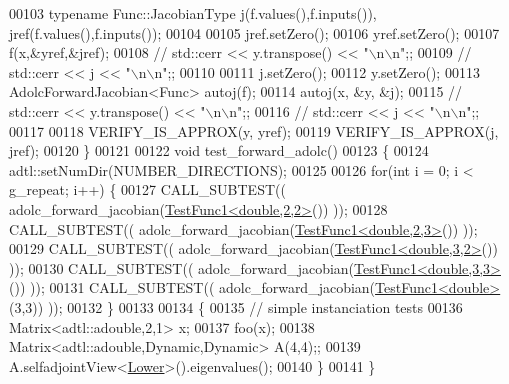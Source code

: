 \begin{DoxyCode}
00103     \textcolor{keyword}{typename} Func::JacobianType j(f.values(),f.inputs()), jref(f.values(),f.inputs());
00104 
00105     jref.setZero();
00106     yref.setZero();
00107     f(x,&yref,&jref);
00108 \textcolor{comment}{//     std::cerr << y.transpose() << "\(\backslash\)n\(\backslash\)n";;}
00109 \textcolor{comment}{//     std::cerr << j << "\(\backslash\)n\(\backslash\)n";;}
00110 
00111     j.setZero();
00112     y.setZero();
00113     AdolcForwardJacobian<Func> autoj(f);
00114     autoj(x, &y, &j);
00115 \textcolor{comment}{//     std::cerr << y.transpose() << "\(\backslash\)n\(\backslash\)n";;}
00116 \textcolor{comment}{//     std::cerr << j << "\(\backslash\)n\(\backslash\)n";;}
00117 
00118     VERIFY\_IS\_APPROX(y, yref);
00119     VERIFY\_IS\_APPROX(j, jref);
00120 \}
00121 
00122 \textcolor{keywordtype}{void} test\_forward\_adolc()
00123 \{
00124   adtl::setNumDir(NUMBER\_DIRECTIONS);
00125 
00126   \textcolor{keywordflow}{for}(\textcolor{keywordtype}{int} i = 0; i < g\_repeat; i++) \{
00127     CALL\_SUBTEST(( adolc\_forward\_jacobian(\hyperlink{struct_test_func1}{TestFunc1<double,2,2>}()) ));
00128     CALL\_SUBTEST(( adolc\_forward\_jacobian(\hyperlink{struct_test_func1}{TestFunc1<double,2,3>}()) ));
00129     CALL\_SUBTEST(( adolc\_forward\_jacobian(\hyperlink{struct_test_func1}{TestFunc1<double,3,2>}()) ));
00130     CALL\_SUBTEST(( adolc\_forward\_jacobian(\hyperlink{struct_test_func1}{TestFunc1<double,3,3>}()) ));
00131     CALL\_SUBTEST(( adolc\_forward\_jacobian(\hyperlink{struct_test_func1}{TestFunc1<double>}(3,3)) ));
00132   \}
00133 
00134   \{
00135     \textcolor{comment}{// simple instanciation tests}
00136     Matrix<adtl::adouble,2,1> x;
00137     foo(x);
00138     Matrix<adtl::adouble,Dynamic,Dynamic> A(4,4);;
00139     A.selfadjointView<\hyperlink{group__enums_gga39e3366ff5554d731e7dc8bb642f83cda891792b8ed394f7607ab16dd716f60e6}{Lower}>().eigenvalues();
00140   \}
00141 \}
\end{DoxyCode}
